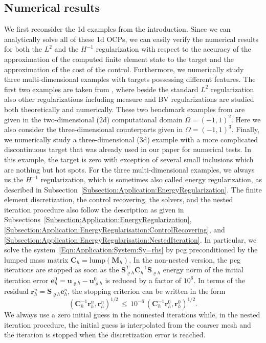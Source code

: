 \documentclass{article}
\numberwithin{equation}{section}
\begin{document}
\subsection{Numerical results}\label{Subsection:NumericalResults}
We first reconsider the 1d examples from the introduction. 
Since we can analytically solve all of these 1d OCPs, we can easily verify 
the numerical results for both the $L^2$ and the $H^{-1}$ regularization 
with respect to the accuracy of the approximation of the computed finite 
element state to the target and the approximation of the cost of the control.
Furthermore, we numerically study three multi-dimensional examples with targets
possessing different features. The first two examples are taken from 
\cite{ClarsonKunisch:2011ESAIM:COCV}, where beside the standard $L^2$
regularization also other regularizations including measure and BV
regularizations are studied both theoretically and numerically. These two
benchmark examples from \cite{ClarsonKunisch:2011ESAIM:COCV} are given in
the two-dimensional (2d) computational domain $\Omega = (-1,1)^2$. Here we
also consider the three-dimensional counterparts given in $\Omega = (-1,1)^3$.
Finally, we numerically study a three-dimensional (3d) example with a more
complicated discontinuous target that was already used in our paper 
\cite{LangerLoescherSteinbachYang:2024CAMWA} for numerical tests. In this
example, the target is zero with exception of several small inclusions which
are nothing but hot spots. For the three multi-dimensional examples, 
we always us the $H^{-1}$ regularization, which is sometimes also called
energy regularization, as described in
Subsection~\ref{Subsection:Application:EnergyRegularization}.
The finite element discretization, the control recovering, the solvers,
and the nested iteration procedure also follow the description as given 
in Subsections~\ref{Subsection:Application:EnergyRegularization},
\ref{Subsection:Application:EnergyRegularisation:ControlRecovering},
and \ref{Subsection:Application:EnergyRegularisation:NestedIteration}.
In particular, we solve the system~\eqref{Eqn:Application:System:Sy=rhs}
by pcg preconditioned by the lumped mass matrix
$\mathbf{C}_h = \mbox{lump}(\mathbf{M}_h)$. In the non-nested version, the
pcg iterations are stopped as soon as the 
$\mathbf{S}_{\varrho h}^T \mathbf{C}_h^{-1} \mathbf{S}_{\varrho h}$ energy norm
of the initial iteration error 
$\mathbf{e}_h^0 = \mathbf{u}_{\varrho h} - \mathbf{u}_{\varrho h}^0$
is reduced by a factor of $10^6$. In terms of the residual 
$\mathbf{r}_h^n = \mathbf{S}_{\varrho h} \mathbf{e}_h^n$,
the stopping criterion can be written in the form
\begin{equation*}
  (\mathbf{C}_h^{-1}\mathbf{r}_h^n,\mathbf{r}_h^n)^{1/2}
  \, \le \, 10^{-6} \, (\mathbf{C}_h^{-1}\mathbf{r}_h^0,\mathbf{r}_h^0)^{1/2}. 
\end{equation*}
We always use a zero initial guess in the nonnested iterations while, in the
nested iteration procedure, the initial guess is interpolated from the coarser
mesh and the iteration is stopped when the discretization error is reached.
\end{document}
